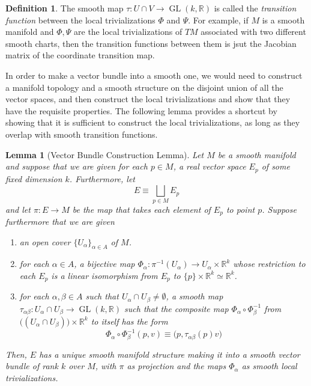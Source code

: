 \documentclass{article}
\DeclareMathOperator{\GL}{GL}
\newtheorem{lemma}[theorem]{Lemma}
\theoremstyle{remark}
\theoremstyle{definition}
\newtheorem{definition}{Definition}[section]
\begin{document}
  \begin{definition}
  The smooth map $\tau: U \cap V \longrightarrow \GL(k, \mathbb{R})$ is called the \textit{transition function} between the local trivializations $\Phi$ and $\Psi$. For example, if $M$ is a smooth manifold and $\Phi, \Psi$ are the local trivializations of $TM$ associated with two different smooth charts, then the transition functions between them is jsut the Jacobian matrix of the coordinate transition map. 
  \end{definition}

  In order to make a vector bundle into a smooth one, we would need to construct a manifold topology and a smooth structure on the disjoint union of all the vector spaces, and then construct the local trivializations and show that they have the requisite properties. The following lemma provides a shortcut by showing that it is sufficient to construct the local trivializations, as long as they overlap with smooth transition functions. 

  \begin{lemma}[Vector Bundle Construction Lemma]
  Let $M$ be a smooth manifold and suppose that we are given for each $p \in M$, a real vector space $E_p$ of some fixed dimension $k$. Furthermore, let 
  \[E \equiv \bigsqcup_{p \in M} E_p\]
  and let $\pi: E \longrightarrow M$ be the map that takes each element of $E_p$ to point $p$. Suppose furthermore that we are given
  \begin{enumerate}
      \item an open cover $\{U_\alpha\}_{\alpha \in A}$ of $M$. 
      \item for each $\alpha \in A$, a bijective map $\Phi_\alpha : \pi^{-1} (U_\alpha) \longrightarrow U_\alpha \times \mathbb{R}^k$ whose restriction to each $E_p$ is a linear isomorphism from $E_p$ to $\{p\} \times \mathbb{R}^k \simeq \mathbb{R}^k$. 
      \item for each $\alpha, \beta \in A$ such that $U_\alpha \cap U_\beta \neq \emptyset$, a smooth map $\tau_{\alpha \beta}: U_\alpha \cap U_\beta \longrightarrow \GL(k, \mathbb{R})$ such that the composite map $\Phi_\alpha \circ \Phi_\beta^{-1}$ from $\big( (U_\alpha \cap U_\beta)\big) \times \mathbb{R}^k$ to itself has the form 
      \[\Phi_\alpha \circ \Phi_\beta^{-1} (p, v) \equiv \big( p, \tau_{\alpha \beta} (p) v \big)\]
  \end{enumerate}
  Then, $E$ has a unique smooth manifold structure making it into a smooth vector bundle of rank $k$ over $M$, with $\pi$ as projection and the maps $\Phi_\alpha$ as smooth local trivializations. 
  \end{lemma}
\end{document}
